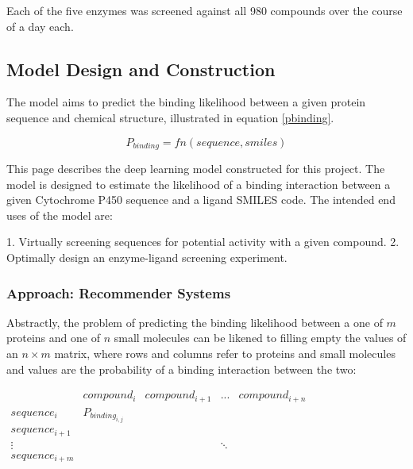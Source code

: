 \documentclass{article}
\begin{document}
Each of the five enzymes was screened against all 980 compounds over the course of a day each.




\subsection{Model Design and Construction}

The model aims to predict the binding likelihood between a given protein sequence and chemical structure, illustrated in equation \ref{pbinding}.


\label{pbinding}
\begin{equation}
P_{binding} = fn(sequence, smiles)
\end{equation}


This page describes the deep learning model constructed for this project.
The model is designed to estimate the likelihood of a binding interaction between a given Cytochrome P450 sequence and a ligand SMILES code.
The intended end uses of the model are:

1. Virtually screening sequences for potential activity with a given compound.
2. Optimally design an enzyme-ligand screening experiment.


\subsubsection{Approach: Recommender Systems}

Abstractly, the problem of predicting the binding likelihood between a one of $m$ proteins and one of $n$ small molecules can be likened to filling empty the values of an $n \times m$ matrix, where rows and columns refer to proteins and small molecules and values are the probability of a binding interaction between the two:

\begin{center}
$
\begin{matrix} 
	 & compound_i & compound_{i+1} & ... & compound_{i+n} \\
	sequence_i  & P_{binding_{i,j}} &  &  & \\  
	sequence_{i+1} &  &  &  &  \\
	 \vdots &  &  & \ddots &  \\
	sequence_{i+m} &  &  &  &   \\
\end{matrix}
$
\end{center}
\end{document}
